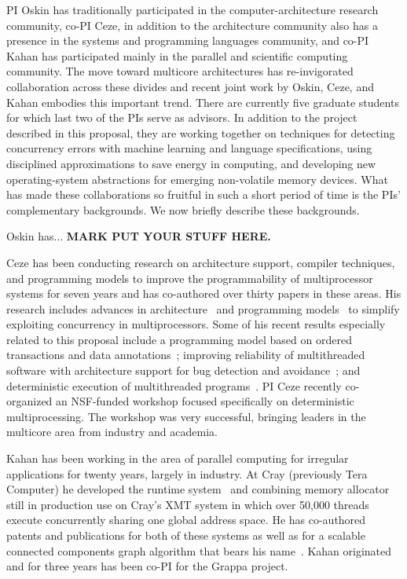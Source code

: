 PI Oskin has traditionally participated in the computer-architecture research
community, co-PI Ceze, in addition to the architecture community also has a
presence in the systems and programming languages community, and co-PI Kahan
has participated mainly in the parallel and scientific computing community.
The move toward multicore architectures has re-invigorated collaboration
across these divides and recent joint work by Oskin, Ceze, and Kahan
embodies this important trend. There are currently five graduate students for
which last two of the PIs serve as advisors. In addition to the project
described in this proposal, they are working together on techniques for
detecting concurrency errors with machine learning and language
specifications, using disciplined approximations to save energy in computing,
and developing new operating-system abstractions for emerging non-volatile
memory devices. What has made these collaborations so fruitful in such a short
period of time is the PIs' complementary backgrounds. We now briefly describe
these backgrounds.

Oskin has... {\bf MARK PUT YOUR STUFF HERE.}

Ceze has been conducting research on architecture support, compiler
techniques, and programming models to improve the programmability of
multiprocessor systems for seven years and has co-authored over thirty
papers in these areas.  His research includes advances in
architecture~\cite{tlsooo, bulk, bulksc, swbulk, cyclops, dmp,
  delorean} and programming models~\cite{colorama, ipot, posh} to
simplify exploiting concurrency in multiprocessors. Some of his recent
results especially related to this proposal include a programming
model based on ordered transactions and data annotations~\cite{ipot};
improving reliability of multithreaded software with architecture
support for bug detection and avoidance~\cite{atomaid, aatoppicks,
  bugaboo, oshajava, cs-isca10, ce-isca10}; and deterministic
execution of multithreaded programs~\cite{dmp, dmptoppicks,
  asplos10coredet, dmpos}. PI Ceze recently co-organized an NSF-funded
workshop focused specifically on deterministic multiprocessing. The
workshop was very successful, bringing leaders in the multicore area
from industry and academia.

Kahan has been working in the area of parallel computing for irregular
applications for twenty years, largely in industry.  At Cray (previously Tera
Computer) he developed the runtime system~\cite{Alverson95schedulingon,Alverson97terahardware-software} and combining memory allocator~\cite{MAMA} still in production use on
Cray's XMT system in which over 50,000 threads execute concurrently sharing one
global address space.  He has co-authored patents and publications for both of these
systems as well as for a scalable connected components graph algorithm that bears
his name~\cite{Underwood07analyzingthe}.
Kahan originated and for three years has been co-PI for the Grappa project.

